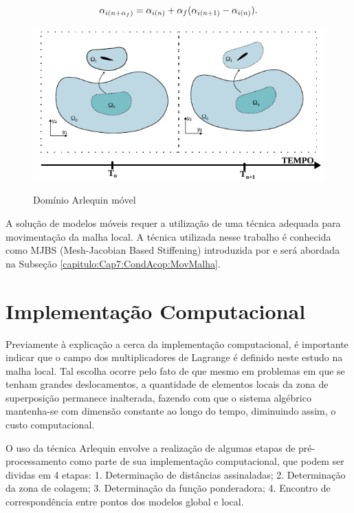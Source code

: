 \documentclass[tese_patricia]{subfiles}
\begin{document}
\begin{align}
	\alpha_{i(n+\alpha_f)} = \alpha_{i(n)} + \alpha_f(\alpha_{i(n+1)} - \alpha_{i(n)}).
\end{align}

\begin{figure}[htb!]
	\centering 
	{\includegraphics[scale=1.5,trim=0cm 0cm 0cm 0cm, clip=true]{Imagens/Cap6/dominioArlequinMovel.pdf}}	
	\caption{Domínio Arlequin móvel}
	\label{fig:dominioArlequinMovel}
\end{figure}

A solução de modelos móveis requer a utilização de uma técnica adequada para movimentação da malha local. A técnica utilizada nesse trabalho é conhecida como MJBS (Mesh-Jacobian Based Stiffening) introduzida por  e será abordada na Subseção \ref{capitulo:Cap7:CondAcop:MovMalha}.


\section{Implementação Computacional}


Previamente à explicação a cerca da implementação computacional, é importante indicar que o campo dos multiplicadores de Lagrange é definido neste estudo na malha local. Tal escolha ocorre pelo fato de que mesmo em problemas em que se tenham grandes deslocamentos, a quantidade de elementos locais da zona de superposição permanece inalterada, fazendo com que o sistema algébrico mantenha-se com dimensão constante ao longo do tempo, diminuindo assim, o custo computacional.

O uso da técnica Arlequin envolve a realização de algumas etapas de pré-processamento como parte de sua implementação computacional, que podem ser dividas em 4 etapas: 1. Determinação de distâncias assinaladas; 2. Determinação da zona de colagem;  3. Determinação da função ponderadora; 4. Encontro de correspondência entre pontos dos modelos global e local.
\end{document}
